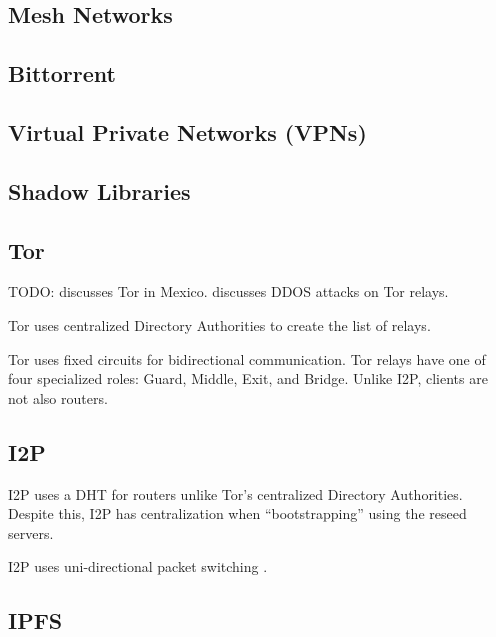 \cite{HowUseUsenet,ohmRegulatingInternetUsenet1998}

\subsection{Mesh Networks}

\cite{kamaliAnixAnonymousBlackoutResistant}

\subsection{Bittorrent} \label{bittorrent}

\subsection{Virtual Private Networks (VPNs)}

\subsection{Shadow Libraries}

\subsection{Tor}

TODO: \cite{iszaevichDistributedDetectionTor2019} discusses Tor in Mexico.
\cite{hollerCaseStudyDDoS2024} discusses DDOS attacks on Tor relays.

Tor uses centralized Directory Authorities \cite{TorProjectDirectory} to create
the list of relays.

Tor uses fixed circuits for bidirectional
communication.\cite{AnalyzingTrendsTor} Tor relays have one of four specialized
roles: Guard, Middle, Exit, and Bridge. Unlike I2P, clients are not also
routers.

\subsection{I2P}

I2P uses a DHT for routers unlike Tor's centralized Directory
Authorities.\cite{NetworkDatabaseI2P} Despite this, I2P has centralization when
``bootstrapping'' using the reseed servers.

I2P uses uni-directional packet switching \cite{I2PComparedTor}.

\subsection{IPFS}
